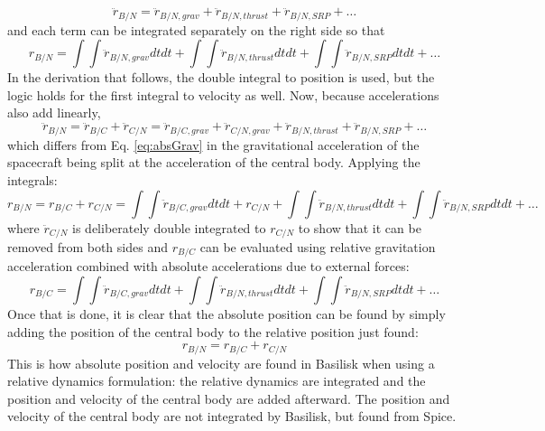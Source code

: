 \begin{equation}
	\ddot{r}_{B/N} = \ddot{r}_{B/N, grav}  + \ddot{r}_{B/N, thrust} + \ddot{r}_{B/N, SRP} + \dots
	\label{eq:absGrav}
\end{equation}
and each term can be integrated separately on the right side so that
\begin{equation}
      r_{B/N} = \int \int \ddot{r}_{B/N, grav} dt dt +   \int \int \ddot{r}_{B/N, thrust} dt dt +  \int \int \ddot{r}_{B/N, SRP}dt dt +  \dots
\end{equation}
In the derivation that follows, the double integral to position is used, but the logic holds for the first integral to velocity as well. Now, because accelerations also add linearly,
\begin{equation}
\ddot{r}_{B/N} = \ddot{r}_{B/C} + \ddot{r}_{C/N} = \ddot{r}_{B/C, grav} +  \ddot{r}_{C/N, grav}  + \ddot{r}_{B/N, thrust} + \ddot{r}_{B/N, SRP} + \dots
\end{equation}
which differs from Eq. \ref{eq:absGrav} in the gravitational acceleration of the spacecraft being split at the acceleration of the central body. Applying the integrals:
\begin{equation}
r_{B/N} = r_{B/C} + r_{C/N} = \int \int \ddot{r}_{B/C, grav} dt dt + r_{C/N}  +   \int \int \ddot{r}_{B/N, thrust} dt dt +  \int \int \ddot{r}_{B/N, SRP}dt dt +  \dots
\end{equation}
where $\ddot{r}_{C/N}$ is deliberately double integrated to $r_{C/N}$ to show that it can be removed from both sides and $r_{B/C}$ can be evaluated using relative gravitation acceleration combined with absolute accelerations due to external forces:
\begin{equation}
r_{B/C}= \int \int \ddot{r}_{B/C, grav} dt dt +   \int \int \ddot{r}_{B/N, thrust} dt dt +  \int \int \ddot{r}_{B/N, SRP}dt dt +  \dots
\end{equation}
Once that is done, it is clear that the absolute position can be found by simply adding the position of the central body to the relative position just found:
\begin{equation}
	r_{B/N} = r_{B/C} + r_{C/N}
\end{equation}
This is how absolute position and velocity are found in Basilisk when using a relative dynamics formulation: the relative dynamics are integrated and the position and velocity of the central body are added afterward. The position and velocity of the central body are not integrated by Basilisk, but found from Spice.

